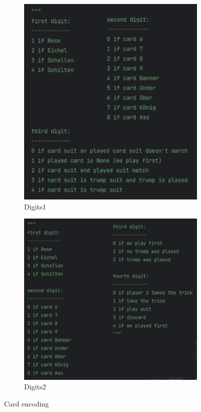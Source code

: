 \begin{figure}[ht!]
    \begin{subfigure}{0.5\textwidth}
        \includegraphics[width=0.9\linewidth]{Figures/digits1} 
        \caption[Digits1]{Digits1}
        \label{fig:digits1}
        \end{subfigure}
        \begin{subfigure}{0.5\textwidth}
        \includegraphics[width=0.9\linewidth]{Figures/digits2}
        \caption[Digits2]{Digits2}
        \label{fig:digits2}
    \end{subfigure}
    \caption{Card encoding}
\label{fig:encoding}
\end{figure}
    
